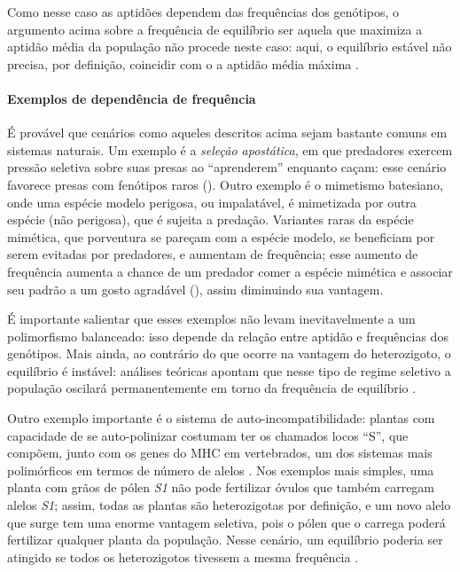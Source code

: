 \begin{refsection}
Como nesse caso as aptidões dependem das frequências dos genótipos, o argumento acima sobre a frequência de equilíbrio ser aquela que maximiza a aptidão média da população não procede neste caso: aqui, o equilíbrio estável não precisa, por definição, coincidir com o a aptidão média máxima \parencite{Charlesworth2010}.


\paragraph{Exemplos de dependência de frequência}

É provável que cenários como aqueles descritos acima sejam bastante comuns em sistemas naturais. Um exemplo é a \emph{seleção apostática}, em que predadores exercem pressão seletiva sobre suas presas ao \enquote{aprenderem} enquanto caçam: esse cenário favorece presas com fenótipos raros (\cite{Clarke1962,Charlesworth2010}). Outro exemplo é o mimetismo batesiano, onde uma espécie modelo perigosa, ou impalatável, é mimetizada por outra espécie (não perigosa), que é sujeita a predação. Variantes raras da espécie mimética, que porventura se pareçam com a espécie modelo, se beneficiam por serem evitadas por predadores, e aumentam de frequência; esse aumento de frequência aumenta a chance de um predador comer a espécie mimética e associar seu padrão a um gosto agradável (\cite{Charlesworth2010}), assim diminuindo sua vantagem.

É importante salientar que esses exemplos não levam inevitavelmente a um polimorfismo balanceado: isso depende da relação entre aptidão e frequências dos genótipos. Mais ainda, ao contrário do que ocorre na vantagem do heterozigoto, o equilíbrio é instável: análises teóricas apontam que nesse tipo de regime seletivo a população oscilará permanentemente em torno da frequência de equilíbrio \parencite{Charlesworth2010}.

	Outro exemplo importante é o sistema de auto-incompatibilidade: plantas com capacidade de se auto-polinizar costumam ter os chamados locos \enquote{S}, que compõem, junto com os genes do MHC em vertebrados, um dos sistemas mais polimórficos em termos de número de alelos \parencite{Charlesworth2010}. Nos exemplos mais simples, uma planta com grãos de pólen \emph{S1} não pode fertilizar óvulos que também carregam alelos \emph{S1}; assim, todas as plantas são heterozigotas por definição, e um novo alelo que surge tem uma enorme vantagem seletiva, pois o pólen que o carrega poderá fertilizar qualquer planta da população. Nesse cenário, um equilíbrio poderia ser atingido se todos os heterozigotos tivessem a mesma frequência \parencite{Charlesworth2010}.
    

\end{refsection}
